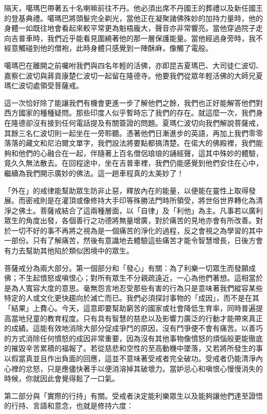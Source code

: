 隔天，噶瑪巴帶著五十名喇嘛前往不丹。他必須出席不丹國王的葬禮以及新任國王的登基典禮。噶瑪巴將頭髮完全剃光，當他正在凝聚諸佛殊妙的加持力量時，他的身體一如既往地會看起來較平常更為魁梧龐大，聲音亦非常響亮。當他穿過院子走向吉普車時，我們近乎能看見圍繞著他的那一層保護能量。當他經過身旁時，我不經意觸碰到他的僧袍，此時身體只感覺到一陣酥麻，像觸了電般。

噶瑪巴在離開之前囑咐我們與四名年輕的活佛，亦即昆吉夏瑪巴、大司徒仁波切、嘉察仁波切與蔣貢康楚仁波切一起留在隆德寺。他要我們從眾年輕活佛的大師兄夏瑪仁波切處領受菩薩戒。

這一次恰好除了能讓我們有機會更進一步了解他們之餘，我們也正好能解答他們對西方國家的種種疑問。那些印度人似乎暫時忘了我們的存在。就這麼一次，我們身在隆德卻沒有接到任何電話提及有關簽證的問題。夏瑪仁波切向我們解說菩薩戒，其餘三名仁波切則一起坐在一旁聆聽。憑著他們日漸進步的英語，再加上我們零零落落的藏文和尼泊爾文單字，我們設法將要點都搞清楚。在偌大的佛殿裡，我們能夠和他們的心融合在一起，伴隨著上百名僧侶琅琅的誦經聲，這其中殊妙的體驗，竟久久無法散去。在回程途中，坐在吉普車裡，我們仍能感覺到他們安住在心中，繼續為我們開示廣妙的佛法。這一趟車程真的太美妙了！

「外在」的戒律能幫助眾生防非止惡，釋放內在的能量，以便能在靈性上取得發展。而密戒則是在灌頂或像修持大手印等殊勝法門時所領受，將世俗世界轉化為清淨之佛土。菩薩戒結合了這兩種層面，以「自律」及「利他」為主。凡事若以廣利眾生的角度出發，各個善行之功德將無量增廣，對於痛苦的見地亦會有所改善。對於一切不好的事不再將之視為是一個痛苦的淨化的過程，反之會視之為學習的其中一部份。只有了解痛苦，然後有意識地去體驗這些痛苦才能令智慧增長，日後方會有力去幫助其他陷於類似困境中的眾生。

菩薩戒分為兩大部分。第一個部分和「發心」有關：為了利樂一切眾生而發願成佛；不生起憤怒或嗔恨心；對所有眾生不分親疏遠近，一心為他們著想。這相當於是為人寬容大度的意思。毫無怨言地忍受那些有害的行為只是意味著我們縱容某些特定的人或文化更快趨向於滅亡而已。我們必須探討事物的「成因」，而不是在其「結果」上費心。今天，這意即要幫助窮苦的國家或社會降低生育率，同時普遍提高當地兒童的教育程度。只有具有智慧的慈悲以及影響力廣泛的行動才能帶來真正的成績。這能有效地消除大部分促成爭鬥的原因，沒有鬥爭便不會有痛苦。以善巧的方式消除任何憤怒的成因非常重要，因為沒有其他事物像憤怒的煩惱般更能徹底的摧毀辛苦累積的福報了。若從慈悲和空性的至高動機中墜落，又若將所發生的事以假當真並且作出負面的回應，這並不意味著受戒者完全破功。受戒者仍能清淨內心裡的忿怒，只是應儘快著手以便消溶掉其破壞力。當妒忌心和嗔恨心慢慢消失的時候，你就因此會覺得鬆了一口氣。

第二部分與「實際的行持」有關。受戒者決定能利樂眾生以及能夠讓他們達至證悟的行持、言語和意念，也就是修持六度：

